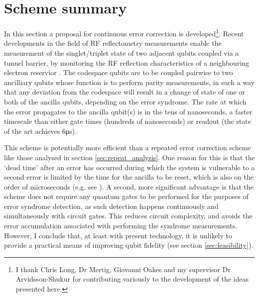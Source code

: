 \documentclass{report}
\begin{document}
\section{Scheme summary}

In this section a proposal for continuous error correction is developed\footnote{I thank Chris Long, Dr Mertig, Giovanni Oakes and my supervisor Dr Arvidsson-Shukur for contributing variously to the development of the ideas presented here.}. Recent developments in the field of RF reflectometry measurements enable the measurement of the singlet/triplet state of two adjacent qubits coupled via a tunnel barrier, by monitoring the RF reflection characteristics of a neighbouring electron reservior \cite{Oakes2022}. The codespace qubits are to be coupled pairwise to two ancilliary qubits whose function is to perform parity measurements, in such a way that any deviation from the codespace will result in a change of state of one or both of the ancilla qubits, depending on the error syndrome. The rate at which the error propagates to the ancilla qubit(s) is in the tens of nanoseconds, a faster timescale than either gate times (hundreds of nanoseconds) or readout (the state of the art \cite{Oakes2022} achieves 6\unit{\micro\second}).

This scheme is potentially more efficient than a repeated error correction scheme like those analysed in section \ref{sec:repeat_analysis}. One reason for this is that the `dead time' after an error has occurred during which the system is vulnerable to a second error is limited by the time for the ancilla to be reset, which is also on the order of microseconds (e.g. see \cite{Nakajima2019}). A second, more significant advantage is that the scheme does not require any quantum gates to be performed for the purposes of error syndrome detection, as such detection happens continuously and simultaneously with circuit gates. This reduces circuit complexity, and avoids the error accumulation associated with performing the syndrome measurements. However, I conclude that, at least with present technology, it is unlikely to provide a practical means of improving qubit fidelity (see section \ref{sec:feasibility}).
\end{document}
